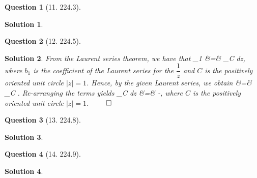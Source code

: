\documentclass{article} %
\def\eQb#1\eQe{\begin{eqnarray*}#1\end{eqnarray*}}
\theoremstyle{quest}
\newtheorem*{question}{Question}
\newtheorem*{solution}{Solution}
\begin{document}
\bigskip

\begin{question}[11. 224.3]
\end{question}
\begin{solution}
\end{solution}

\bigskip

\begin{question}[12. 224.5]
\end{question}
\begin{solution}
From the Laurent series theorem, we have that
\eQb
b_1 &=&  \int_{C}  dz,
\eQe
where $b_1$ is the coefficient of the Laurent series for the $\dfrac{1}{z}$
and $C$ is the positively oriented unit circle $|z| = 1$.
Hence, by the given Laurent series, we obtain
\eQb
- &=&  \int_{C} .
\eQe
Re-arranging the terms yields
\eQb
\int_{C}  dz &=& -,
\eQe
where $C$ is the positively oriented unit circle $|z| = 1$. $\qed$

\end{solution}
\bigskip

\begin{question}[13. 224.8]
\end{question}
\begin{solution}
\end{solution}
\bigskip

\begin{question}[14. 224.9]
\end{question}
\begin{solution}
\end{solution}
\bigskip
\end{document}
